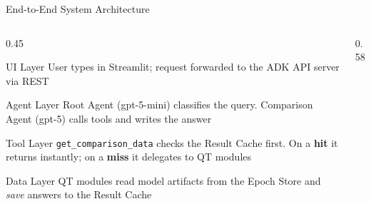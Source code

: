 \documentclass[aspectratio=169,10pt]{beamer}
\begin{document}
\begin{frame}[t]{End-to-End System Architecture}
\vspace{0pt}
\begin{columns}[T]
  \begin{column}{0.45\textwidth}
    \vspace{0pt}
    \begin{block}{\small UI Layer}
      \footnotesize User types in Streamlit; request forwarded
      to the ADK API server via REST
    \end{block}
    \vspace{0pt}
    \begin{block}{\small Agent Layer}
      \footnotesize Root Agent (gpt-5-mini) classifies the query.
      Comparison Agent (gpt-5) calls tools and writes the answer
    \end{block}
    \vspace{0pt}
    \begin{block}{\small Tool Layer}
      \footnotesize \texttt{get\_comparison\_data} checks the
      Result Cache first. On a \textbf{hit} it returns instantly;
      on a \textbf{miss} it delegates to QT modules
    \end{block}
    \vspace{0pt}
    \begin{block}{\small Data Layer}
      \footnotesize QT modules read model artifacts from the
      Epoch Store and \emph{save} answers to the Result Cache
    \end{block}
  \end{column}
  \begin{column}{0.58\textwidth}
    \vspace{2pt}
    \begin{center}
\end{center}
\end{column}
\end{columns}
\end{frame}
\end{document}
